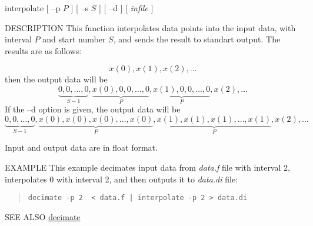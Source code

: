 \begin{synopsis}
\item[interpolate] [ --p $P$ ] [ --s $S$ ] [ --d ] [ {\em infile} ]
\end{synopsis}

\begin{qsection}{DESCRIPTION}
This function interpolates data points into the input data, with
interval $P$ and start number $S$, and sends the result to standart
output. The results are as follows:

\begin{displaymath}
 x(0), x(1), x(2), \dots
\end{displaymath}
then the output data will be
\begin{displaymath}
\underbrace{0, 0, \dots, 0}_{S-1},\underbrace{x(0), 0, 0, \dots, 0}_{P},\underbrace{x(1), 0, 0, \dots, 0}_{P},x(2), \dots
\end{displaymath}
If the --d option is given, the output data will be
\begin{displaymath}
\underbrace{0, 0, \dots, 0}_{S-1},\underbrace{x(0), x(0), x(0), \dots, x(0)}_{P},\underbrace{x(1), x(1), x(1), \dots, x(1)}_{P},x(2), \dots
\end{displaymath}
\par
Input and output data are in float format.
\end{qsection}

\begin{options}
\end{options}

\begin{qsection}{EXAMPLE}
This example decimates input data from {\em data.f} file with interval 2,
interpolates 0 with interval 2, and then outputs it to {\em
data.di} file:
\begin{quote}
  \verb!decimate -p 2  < data.f | interpolate -p 2 > data.di!
\end{quote}
\end{qsection}

\begin{qsection}{SEE ALSO}
\hyperlink{decimate}{decimate}
\end{qsection}
